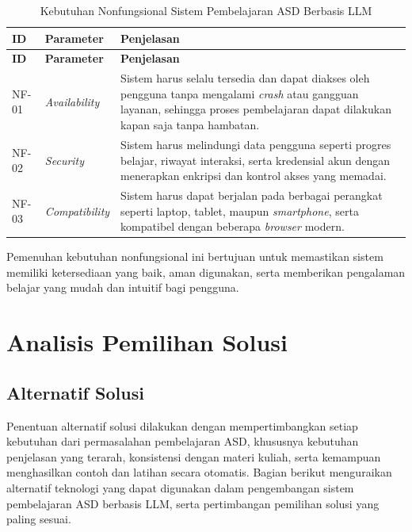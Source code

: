 \begin{longtable}{|p{1.8cm}|p{3cm}|p{7.5cm}|}
\caption{Kebutuhan Nonfungsional Sistem Pembelajaran ASD Berbasis LLM}
\label{tab:kebutuhan-nonfungsional} \\

\hline
\textbf{ID} & \textbf{Parameter} & \textbf{Penjelasan} \\
\hline
\endfirsthead

\hline
\textbf{ID} & \textbf{Parameter} & \textbf{Penjelasan} \\
\hline
\endhead

\hline
NF-01 & \textit{Availability} &
Sistem harus selalu tersedia dan dapat diakses oleh pengguna tanpa mengalami \textit{crash} atau gangguan layanan, sehingga proses pembelajaran dapat dilakukan kapan saja tanpa hambatan. \\
\hline

NF-02 & \textit{Security} &
Sistem harus melindungi data pengguna seperti progres belajar, riwayat interaksi, serta kredensial akun dengan menerapkan enkripsi dan kontrol akses yang memadai. \\
\hline

NF-03 & \textit{Compatibility} &
Sistem harus dapat berjalan pada berbagai perangkat seperti laptop, tablet, maupun \textit{smartphone}, serta kompatibel dengan beberapa \textit{browser} modern. \\
\hline

\end{longtable}


Pemenuhan kebutuhan nonfungsional ini bertujuan untuk memastikan sistem memiliki ketersediaan yang baik, aman digunakan, serta memberikan pengalaman belajar yang mudah dan intuitif bagi pengguna.


\section{Analisis Pemilihan Solusi}

\subsection{Alternatif Solusi}

Penentuan alternatif solusi dilakukan dengan mempertimbangkan setiap kebutuhan dari permasalahan pembelajaran ASD, khususnya kebutuhan penjelasan yang terarah, konsistensi dengan materi kuliah, serta kemampuan menghasilkan contoh dan latihan secara otomatis. Bagian berikut menguraikan alternatif teknologi yang dapat digunakan dalam pengembangan sistem pembelajaran ASD berbasis LLM, serta pertimbangan pemilihan solusi yang paling sesuai.

